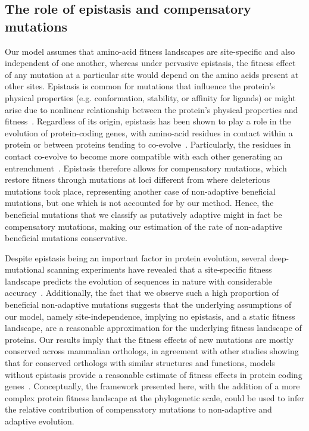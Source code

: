 \documentclass[10pt,letterpaper]{article}
\begin{document}
\subsection*{The role of epistasis and compensatory mutations}

Our model assumes that amino-acid fitness landscapes are site-specific and also independent of one another, whereas under pervasive epistasis, the fitness effect of any mutation at a particular site would depend on the amino acids present at other sites.
Epistasis is common for mutations that influence the protein’s physical properties (e.g. conformation, stability, or affinity for ligands) or might arise due to nonlinear relationship between the protein’s physical properties and fitness~\cite{starr_epistasis_2016}.
Regardless of its origin, epistasis has been shown to play a role in the evolution of protein-coding genes, with amino-acid residues in contact within a protein or between proteins tending to co-evolve~\cite{morcos_directcoupling_2011, marks_protein_2012, starr_epistasis_2016}.
Particularly, the residues in contact co-evolve to become more compatible with each other generating an entrenchment~\cite{goldstein_nonadaptive_2015, goldstein_sequence_2017, park_epistatic_2022}.
Epistasis therefore allows for compensatory mutations, which restore fitness through mutations at loci different from where deleterious mutations took place, representing another case of non-adaptive beneficial mutations, but one which is not accounted for by our method.
Hence, the beneficial mutations that we classify as putatively adaptive might in fact be compensatory mutations, making our estimation of the rate of non-adaptive beneficial mutations conservative.

Despite epistasis being an important factor in protein evolution, several deep-mutational scanning experiments have revealed that a site-specific fitness landscape predicts the evolution of sequences in nature with considerable accuracy~\cite{ashenberg_mutational_2013, doud_sitespecific_2015, bloom_identification_2017}.
Additionally, the fact that we observe such a high proportion of beneficial non-adaptive mutations suggests that the underlying assumptions of our model, namely site-independence, implying no epistasis, and a static fitness landscape, are a reasonable approximation for the underlying fitness landscape of proteins.
Our results imply that the fitness effects of new mutations are mostly conserved across mammalian orthologs, in agreement with other studies showing that for conserved orthologs with similar structures and functions, models without epistasis provide a reasonable estimate of fitness effects in protein coding genes~\cite{youssef_consequences_2020, vigue_deciphering_2022}.
Conceptually, the framework presented here, with the addition of a more complex protein fitness landscape at the phylogenetic scale, could be used to infer the relative contribution of compensatory mutations to non-adaptive and adaptive evolution.
\end{document}
